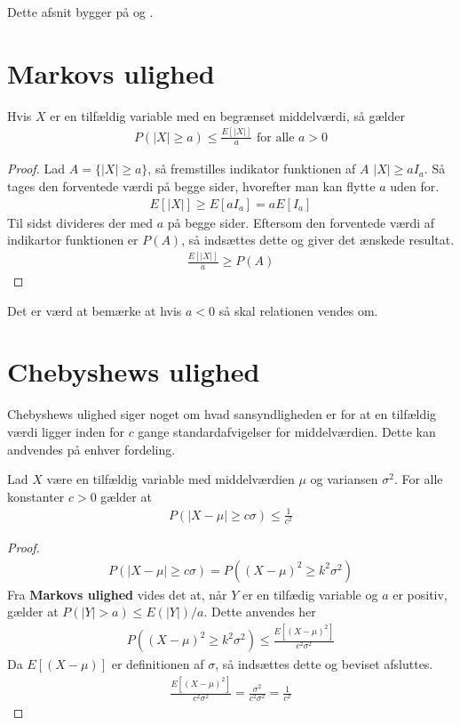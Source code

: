 Dette afsnit bygger på \cite{sandsynlighedsBog} og \cite[]{grimsandsynlighedsBog}.
\section{Markovs ulighed}
\begin{theorem}
Hvis $X$ er en tilfældig variable med en begrænset middelværdi, så gælder
\begin{align*}
    P(|X|\geq a) \leq \frac{E[|X|]}{a} \text{ for alle } a > 0
\end{align*}
\end{theorem}
\begin{proof}
Lad $A=\{|X|\geq a\}$, så fremstilles indikator funktionen af $A$ $|X|\geq aI_a$. Så tages den forventede værdi på begge sider, hvorefter man kan flytte $a$ uden for.
\begin{align*}
E[|X|]\geq E[aI_a] = a E[I_a]
\end{align*} 
Til sidst divideres der med $a$ på begge sider. Eftersom den forventede værdi af indikartor funktionen er $P(A)$, så indsættes dette og giver det ænskede resultat.
\begin{align*}
    \frac{E[|X|]}{a} \geq P(A)
\end{align*} 
\end{proof}
Det er værd at bemærke at hvis $a<0$ så skal relationen vendes om.

\section{Chebyshews ulighed}
Chebyshews ulighed siger noget om hvad sansyndligheden er for at en tilfældig værdi ligger inden for $c$ gange standardafvigelser for middelværdien. Dette kan andvendes på enhver fordeling. 
\begin{theorem}
    Lad $X$ være en tilfældig variable med middelværdien $\mu$ og variansen $\sigma^2$. For alle konstanter $c>0$ gælder at 
    \begin{align*}
        P(|X-\mu|\geq c \sigma)\leq \frac{1}{c^2}
    \end{align*} 
\end{theorem}
\begin{proof}%
    \begin{align*}
        P(|X-\mu|\geq c \sigma)=P((X-\mu)^2\geq k^2\sigma^2)
    \end{align*}
Fra \textbf{Markovs ulighed} vides det at, når $Y$ er en tilfædig variable og $a$ er positiv, gælder at $P(|Y|>a)\leq E(|Y|)/a$. Dette anvendes her
\begin{align*}
    P((X-\mu)^2\geq k^2\sigma^2) \leq \frac{E[(X-\mu)^2]}{c^2\sigma^2}
\end{align*}
Da $E[(X-\mu)]$ er definitionen af $\sigma$, så indsættes dette og beviset afsluttes.
\begin{align*}
    \frac{E[(X-\mu)^2]}{c^2\sigma^2} = \frac{\sigma^2}{c^2\sigma^2} = \frac{1}{c^2}
\end{align*}
\end{proof}
